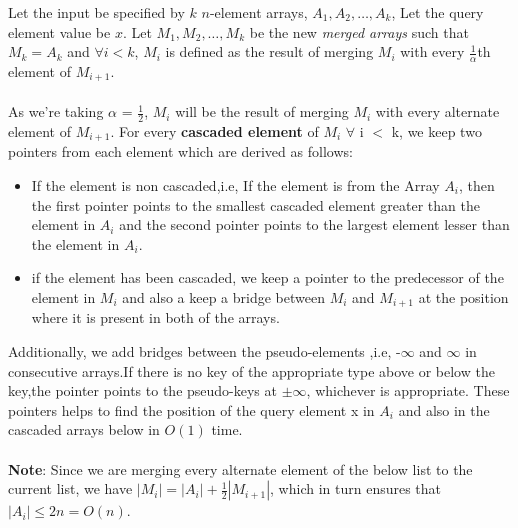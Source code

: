 \documentclass[11pt]{article}
\begin{document}
Let the input be specified by $k$ $n$-element arrays, $A_1,A_2,\dots,A_k$, Let the query element value be $x$.
Let $M_1,M_2,\dots,M_k$ be the new \textit{merged arrays} such that $M_k = A_k$ and $\forall i < k$, $M_i$ is defined as the result of merging $M_i$ with every $\frac{1}{\alpha}$th element of $M_{i+1}$. \\ \\
As we're taking $\alpha$ = $\frac{1}{2}$, $M_i$ will be the result of merging $M_i$ with every alternate element of $M_{i+1}$. For every \textbf{cascaded element} of $M_i$ $\forall$ i $<$ k, we keep two pointers from each element which are derived as follows:
\begin{itemize}
    \item If the element is non cascaded,i.e, If the element is from the Array $A_i$, then the first pointer points to the smallest cascaded element greater than the element in $A_i$ and the second pointer points to the largest element lesser than the element in $A_i$. 
 
    \item if the element has been cascaded, we keep a pointer to the predecessor of the element in $M_i$ and also a keep a bridge between $M_i$ and $M_{i+1}$ at the position where it is present in both of the arrays.
\end{itemize}
Additionally, we add bridges between the pseudo-elements ,i.e,  -$\infty$ and $\infty$ in consecutive arrays.If there is no key of the appropriate type above or below the key,the pointer points to the pseudo-keys at $\pm \infty$, whichever is appropriate.
These pointers helps to find the position of the query element x in $A_i$ and also in the cascaded arrays below in $O(1)$ time. \\ \\
\textbf{Note}: Since we are merging every alternate element of the below list to the current list, we have 
$|M_i| = |A_i| +\frac{1}{2}|M_{i+1}|$, which in turn ensures that $|A_i| \leq 2n = O(n)$. \\
\end{document}

